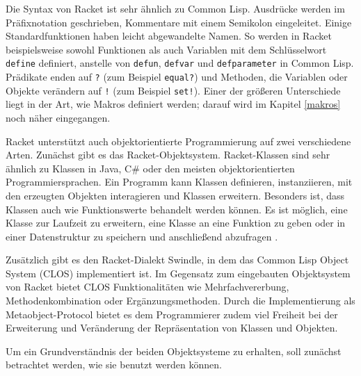 Die Syntax von Racket ist sehr ähnlich zu Common Lisp. Ausdrücke werden im Präfixnotation geschrieben, Kommentare mit einem Semikolon eingeleitet. Einige Standardfunktionen haben leicht abgewandelte Namen. So werden in Racket beispielsweise sowohl Funktionen als auch Variablen mit dem Schlüsselwort \texttt{define} definiert, anstelle von \texttt{defun}, \texttt{defvar} und \texttt{defparameter} in Common Lisp. Prädikate enden auf \texttt{?} (zum Beispiel \texttt{equal?}) und Methoden, die Variablen oder Objekte verändern auf \texttt{!} (zum Beispiel \texttt{set!}). Einer der größeren Unterschiede liegt in der Art, wie Makros definiert werden; darauf wird im Kapitel \ref{makros} noch näher eingegangen.

Racket unterstützt auch objektorientierte Programmierung auf zwei verschiedene Arten. Zunächst gibt es das Racket-Objektsystem. Racket-Klassen sind sehr ähnlich zu Klassen in Java, C\# oder den meisten objektorientierten Programmiersprachen. Ein Programm kann Klassen definieren, instanziieren, mit den erzeugten Objekten interagieren und Klassen erweitern. Besonders ist, dass Klassen auch wie Funktionswerte behandelt werden können. Es ist möglich, eine Klasse zur Laufzeit zu erweitern, eine Klasse an eine Funktion zu geben oder in einer Datenstruktur zu speichern und anschließend abzufragen \cite{neu-edu}. 

Zusätzlich gibt es den Racket-Dialekt Swindle, in dem das Common Lisp Object System (CLOS) implementiert ist. Im Gegensatz zum eingebauten Objektsystem von Racket bietet CLOS Funktionalitäten wie Mehrfachvererbung, Methodenkombination oder Ergänzungsmethoden. Durch die Implementierung als Metaobject-Protocol bietet es dem Programmierer zudem viel Freiheit bei der Erweiterung und Veränderung der Repräsentation von Klassen und Objekten.

Um ein Grundverständnis der beiden Objektsysteme zu erhalten, soll zunächst betrachtet werden, wie sie benutzt werden können. %

